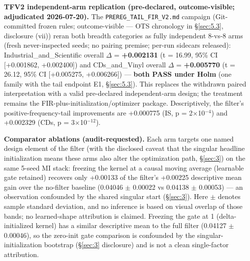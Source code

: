 \textbf{TFV2 independent-arm replication (pre-declared, outcome-visible; adjudicated 2026-07-20).} The \texttt{PREREG\_TAIL\_FIR\_V2.md} campaign (Git-committed frozen rules; outcome-visible --- OTS chronology in \S\ref{sec:5.3}, disclosure (vii)) reran both breadth categories as fully independent 8-vs-8 arms (fresh never-inspected seeds; no pairing premise; per-run sidecars released): Industrial\_and\_Scientific overall \ensuremath{\Delta} = \textbf{+0.002131} (t = 16.99, 95\% CI {[}+0.001862, +0.002400{]}) and CDs\_and\_Vinyl overall \ensuremath{\Delta} = \textbf{+0.005770} (t = 26.12, 95\% CI {[}+0.005275, +0.006266{]}) --- \textbf{both PASS under Holm} (one family with the tail endpoint E1, \S\ref{sec:5.3}). This replaces the withdrawn paired interpretation with a valid pre-declared independent-arm design; the treatment remains the FIR-plus-initialization/optimizer package. Descriptively, the filter's positive-frequency-tail improvements are +0.000775 (IS, p = 2\ensuremath{\times}10$^{-4}$) and +0.002329 (CDs, p = 3\ensuremath{\times}10$^{-12}$).

\textbf{Comparator ablations (audit-requested).} Each arm targets one named design element of the filter (with the disclosed caveat that the singular headline initialization means these arms also alter the optimization path, \S\ref{sec:3}) on the same 5-seed MI stack: freezing the kernel at a causal moving average (learnable gate retained) recovers only +0.00133 of the filter's +0.00225 descriptive mean gain over the no-filter baseline (0.04046 \ensuremath{\pm} 0.00022 vs 0.04138 \ensuremath{\pm} 0.00053) --- an observation confounded by the shared singular start (\S\ref{sec:3}). Here \ensuremath{\pm} denotes sample standard deviation, and no inference is based on visual overlap of those bands; no learned-shape attribution is claimed. Freezing the gate at 1 (delta-initialized kernel) has a similar descriptive mean to the full filter (0.04127 \ensuremath{\pm} 0.00046), so the zero-init gate comparison is confounded by the singular-initialization bootstrap (\S\ref{sec:3} disclosure) and is not a clean single-factor attribution.

